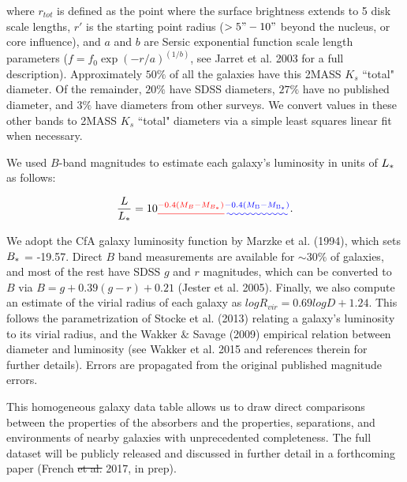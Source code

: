 \documentclass[twocolumn,tighten]{aastex6}
\providecommand{\DIFadd}[1]{{\protect\color{blue}\uwave{#1}}} %
\providecommand{\DIFdel}[1]{{\protect\color{red}\sout{#1}}}                      %
\providecommand{\DIFaddbegin}{} %
\providecommand{\DIFaddend}{} %
\providecommand{\DIFdelbegin}{} %
\providecommand{\DIFdelend}{} %
\begin{document}
\noindent where $r_{tot}$ is defined as the point where the surface brightness extends to 5 disk scale lengths, $r'$ is the starting point radius ($>5" - 10"$ beyond the nucleus, or core influence), and $a$ and $b$ are Sersic exponential function scale length parameters ($f = f_0 \exp{(-r/a)}^{(1/b)}$, see Jarret et al. 2003 for a full description). Approximately $50\%$ of all the galaxies have this 2MASS \DIFdelbegin \DIFdel{$K_s$ }\DIFdelend \DIFaddbegin \DIFadd{$K_{s}$ }\DIFaddend ``total" diameter. Of the remainder, $20\%$ have SDSS diameters, $27\%$ have no published diameter, and $3\%$ have diameters from other surveys. We convert values in these other bands to 2MASS \DIFdelbegin \DIFdel{$K_s$ }\DIFdelend \DIFaddbegin \DIFadd{$K_{s}$ }\DIFaddend ``total" diameters via a simple least squares linear fit when necessary.

We used $B$-band magnitudes to estimate each galaxy's luminosity in units of $L_{\**}$ as follows:

\begin{equation}
	\frac{L}{L_{\**}} = 10\DIFdelbegin \DIFdel{^{-0.4 (M_{B} - M_{B_{\**}})}}\DIFdelend \DIFaddbegin \DIFadd{^{-0.4 (M_{\rm B} - M_{\rm B_{\**}})}}\DIFaddend .
\end{equation}

We adopt the CfA galaxy luminosity function by Marzke et al. (1994), which sets $B_{\**} $ = -19.57. Direct $B$ band measurements are available for $\sim 30\%$ of galaxies, and most of the rest have SDSS $g$ and $r$ magnitudes, which can be converted to $B$ via $B = g + 0.39 (g-r) + 0.21$ (Jester et al. 2005). Finally, we also compute an estimate of the virial radius of each galaxy as \DIFdelbegin \DIFdel{$log R_{vir} = 0.69 log D + 1.24$}\DIFdelend \DIFaddbegin \DIFadd{$\log R_{vir} = 0.69 \log D + 1.24$}\DIFaddend . This follows the parametrization of Stocke et al. (2013) relating a galaxy's luminosity to its virial radius, and the Wakker $\&$ Savage (2009) empirical relation between diameter and luminosity (see Wakker et al. 2015 and references therein for further details). Errors are propagated from the original published magnitude errors.

This homogeneous galaxy data table allows us to draw direct comparisons between the properties of the absorbers and the properties, separations, and environments of nearby galaxies with unprecedented completeness. The full dataset will be publicly released and discussed in further detail in a forthcoming paper (French \DIFdelbegin \DIFdel{et al. }\DIFdelend \DIFaddbegin \DIFadd{$\&$ Wakker }\DIFaddend 2017, in prep).
\end{document}
